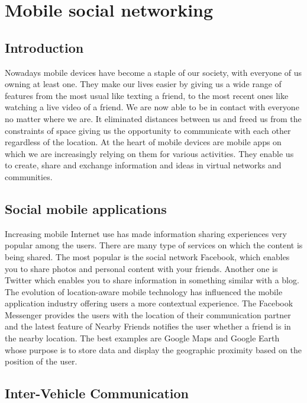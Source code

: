 \chapter{Mobile social networking}\label{chap1}


\section{Introduction}

Nowadays mobile devices have become a staple of our society, with everyone of
us owning at least one. They make our lives easier by giving us a wide range of
features from the most usual like texting a friend, to the most recent ones like
watching a live video of a friend. We are now able to be in contact with
everyone no matter where we are. It eliminated distances between us and
freed us from the constraints of space giving us the opportunity to communicate
with each other regardless of the location.
At the heart of mobile devices are mobile apps on which we are increasingly
relying on them for various activities. They enable us to create, share and
exchange information and ideas in virtual networks and communities.

\section{Social mobile applications}

Increasing mobile Internet use has made information sharing experiences very
popular among the users. There are many type of services on which the content is
being shared. The most popular is the social network Facebook, which enables you
to share photos and personal content with your friends. Another one is Twitter
which enables you to share information in something similar with a blog.
The evolution of location-aware mobile technology has influenced the mobile
application industry offering users a more contextual experience. The Facebook
Messenger provides the users with the location of their communication partner
and the latest feature of Nearby Friends notifies the user whether a friend is
in the nearby location. The best examples are Google Maps and Google Earth whose
purpose is to store data and display the geographic proximity based on the
position of the user.

\section{Inter-Vehicle Communication}

